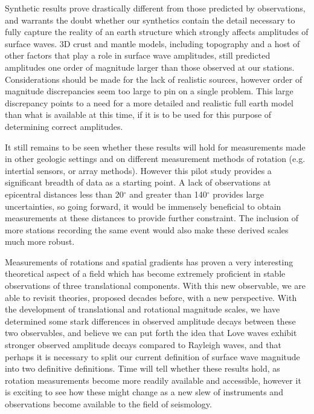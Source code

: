 \documentclass{gji}
\begin{document}
Synthetic results prove drastically different from those predicted by observations, and warrants the doubt whether our synthetics contain the detail necessary to fully capture the reality of an earth structure which strongly affects amplitudes of surface waves. 3D crust and mantle models, including topography and a host of other factors that play a role in surface wave amplitudes, still predicted amplitudes one order of magnitude larger than those observed at our stations. Considerations should be made for the lack of realistic sources, however order of magnitude discrepancies seem too large to pin on a single problem. This large discrepancy points to a need for a more detailed and realistic full earth model than what is available at this time, if it is to be used for this purpose of determining correct amplitudes.

It still remains to be seen whether these results will hold for measurements made in other geologic settings and on different measurement methods of rotation (e.g. intertial sensors, or array methods). However this pilot study provides a significant breadth of data as a starting point. A lack of observations at epicentral distances less than 20$^\circ$ and greater than 140$^\circ$ provides large uncertainties, so going forward, it would be immensely beneficial to obtain measurements at these distances to provide further constraint. The inclusion of more stations recording the same event would also make these derived scales much more robust. 

Measurements of rotations and spatial gradients has proven a very interesting theoretical aspect of a field which has become extremely proficient in stable observations of three translational components. With this new observable, we are able to revisit theories, proposed decades before, with a new perspective. With the development of translational and rotational magnitude scales, we have determined some stark differences in observed amplitude decays between these two observables, and believe we can put forth the idea that Love waves exhibit stronger observed amplitude decays compared to Rayleigh waves, and that perhaps it is necessary to split our current definition of surface wave magnitude into two definitive definitions. Time will tell whether these results hold, as rotation measurements become more readily available and accessible, however it is exciting to see how these might change as a new slew of instruments and observations become available to the field of seismology. 
\end{document}
